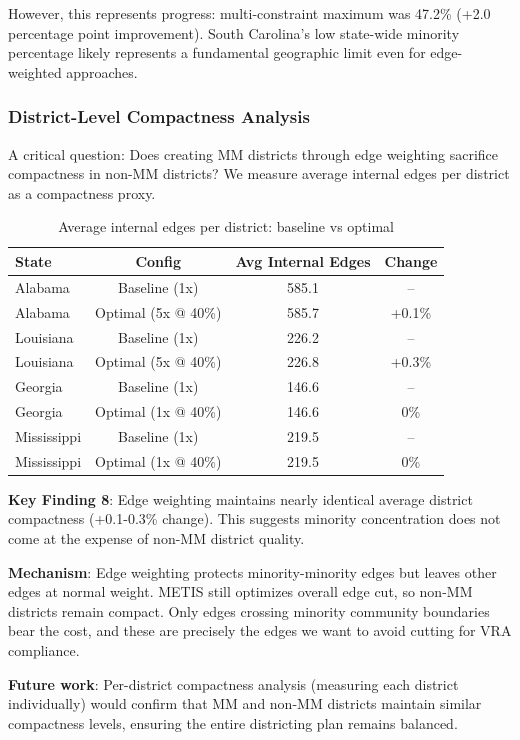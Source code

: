 However, this represents progress: multi-constraint maximum was 47.2\% (+2.0 percentage point improvement). South Carolina's low state-wide minority percentage likely represents a fundamental geographic limit even for edge-weighted approaches.

\subsubsection{District-Level Compactness Analysis}

A critical question: Does creating MM districts through edge weighting sacrifice compactness in non-MM districts? We measure average internal edges per district as a compactness proxy.

\begin{table}[h]
\centering
\begin{tabular}{lccc}
\toprule
State & Config & Avg Internal Edges & Change \\
\midrule
Alabama & Baseline (1x) & 585.1 & -- \\
Alabama & Optimal (5x @ 40\%) & 585.7 & +0.1\% \\
Louisiana & Baseline (1x) & 226.2 & -- \\
Louisiana & Optimal (5x @ 40\%) & 226.8 & +0.3\% \\
Georgia & Baseline (1x) & 146.6 & -- \\
Georgia & Optimal (1x @ 40\%) & 146.6 & 0\% \\
Mississippi & Baseline (1x) & 219.5 & -- \\
Mississippi & Optimal (1x @ 40\%) & 219.5 & 0\% \\
\bottomrule
\end{tabular}
\caption{Average internal edges per district: baseline vs optimal}
\label{tab:district_compactness}
\end{table}

\textbf{Key Finding 8}: Edge weighting maintains nearly identical average district compactness (+0.1-0.3\% change). This suggests minority concentration does not come at the expense of non-MM district quality.

\textbf{Mechanism}: Edge weighting protects minority-minority edges but leaves other edges at normal weight. METIS still optimizes overall edge cut, so non-MM districts remain compact. Only edges crossing minority community boundaries bear the cost, and these are precisely the edges we want to avoid cutting for VRA compliance.

\textbf{Future work}: Per-district compactness analysis (measuring each district individually) would confirm that MM and non-MM districts maintain similar compactness levels, ensuring the entire districting plan remains balanced.
